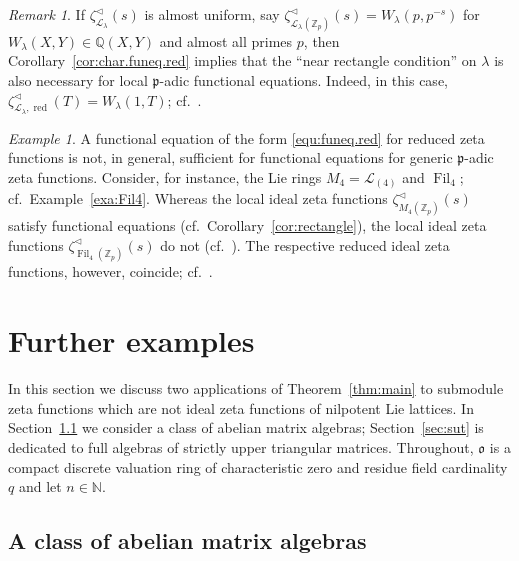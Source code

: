 \documentclass[11pt]{amsart}
\numberwithin{equation}{section}
\numberwithin{figure}{section}
\theoremstyle{plain}
\theoremstyle{definition}
\theoremstyle{remark}
\newtheorem{remark}[theorem]{Remark}
\newtheorem{example}[theorem]{Example}
\begin{document}
\begin{remark}
  If $\zeta^{\triangleleft}_{{\ensuremath{\mathcal{L}}}_{\lambda}}(s)$ is almost uniform, say
  $\zeta^{\triangleleft}_{{\ensuremath{\mathcal{L}}}_{\lambda}({\ensuremath{\mathbb{Z}_p}})}(s)= W_{\lambda}(p,p^{-s})$ for
  $W_\lambda(X,Y)\in{\ensuremath{\mathbb{Q}}}(X,Y)$ and almost all primes $p$, then
  Corollary~\ref{cor:char.funeq.red} implies that the ``near rectangle
  condition'' on $\lambda$ is also necessary for local ${\mathfrak{p}}$-adic
  functional equations. Indeed, in this case,
  $\zeta^{\triangleleft}_{{\ensuremath{\mathcal{L}}}_{\lambda},\operatorname{red}}(T) = W_{\lambda}(1,T)$;
  cf.\ \cite[Section~3]{Evseev/09}.
\end{remark}

\begin{example}\label{exa:M4.vs.Fil4}
  A functional equation of the form \eqref{equ:funeq.red} for reduced
  zeta functions is not, in general, sufficient for functional
  equations for generic ${\mathfrak{p}}$-adic zeta functions. Consider, for
  instance, the Lie rings $M_4={\ensuremath{\mathcal{L}}}_{(4)}$ and $\operatorname{Fil}_4$;
  cf.\ Example~\ref{exa:Fil4}. Whereas the local ideal zeta functions
  $\zeta^{\triangleleft}_{M_4({\ensuremath{\mathbb{Z}_p}})}(s)$ satisfy functional equations
  (cf.\ Corollary~\ref{cor:rectangle}), the local ideal zeta functions
  $\zeta^{\triangleleft}_{\operatorname{Fil}_4({\ensuremath{\mathbb{Z}_p}})}(s)$ do not
  (cf.\ \cite[Theorem~2.39]{duSWoodward/08}). The respective reduced
  ideal zeta functions, however, coincide;
  cf.\ \cite[Example~4.5]{Evseev/09}.
\end{example}

\section{Further examples}\label{sec:further}
In this section we discuss two applications of Theorem~\ref{thm:main}
to submodule zeta functions which are not ideal zeta functions of
nilpotent Lie lattices. In Section~\ref{sec:abelian} we consider a
class of abelian matrix algebras; Section~\ref{sec:sut} is dedicated
to full algebras of strictly upper triangular matrices. Throughout,
${\mathfrak o}$ is a compact discrete valuation ring of characteristic zero and
residue field cardinality $q$ and let $n\in{\ensuremath{\mathbb{N}}}$.

\subsection{A class of abelian matrix algebras}\label{sec:abelian}
\end{document}
